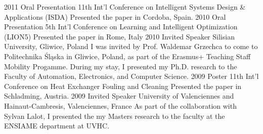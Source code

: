 \begin{entrylist}
\entry
{2011}
{Oral Presentation}
{11th Int'l Conference on Intelligent Systems Design \& Applications (ISDA)}
{Presented the paper   in Cordoba, Spain.}
\entry
{2010}
{Oral Presentation}
{5th Int'l Conference on Learning and Intelligent Optimization (LION5)}
{Presented the paper  in Rome, Italy}
\entry
{2010}
{Invited Speaker}
{Silisian University, Gliwice, Poland}
{I was invited by Prof. Waldemar Grzechca to come to Politechnika Śląska in Gliwice, Poland, as part of the Erasmus+ Teaching Staff Mobility Progamme. During my stay, I presented my Ph.D. research to the Faculty of Automation, Electronics, and Computer Science.}
\entry
{2009}
{Poster}
{11th Int'l Conference on Heat Exchanger Fouling and Cleaning}
{Presented the paper  in Schladming, Austria.}
\entry
{2009}
{Invited Speaker}
{University of Valenciennes and Hainaut-Cambresis, Valenciennes, France}
{As part of the collaboration with Sylvan Lalot, I presented the my Masters research to the faculty at the ENSIAME department at UVHC.}
\end{entrylist}
